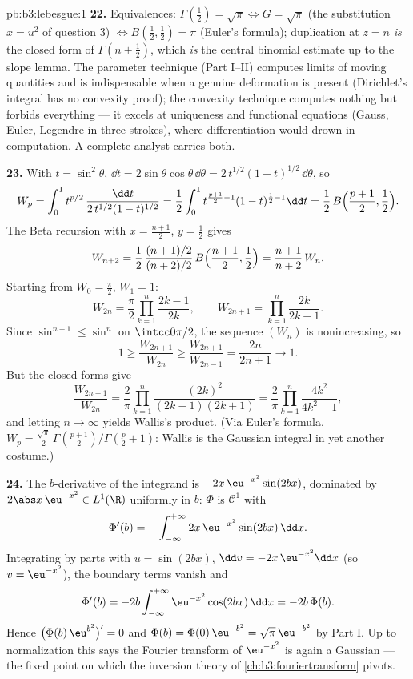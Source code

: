 \begin{solution}{pb:b3:lebesgue:1}
\textbf{22.} Equivalences: $\Gamma(\frac12) = \sqrt\pi
\Leftrightarrow G = \sqrt\pi$ (the substitution $x = u^2$ of
question 3) $\Leftrightarrow B(\frac12, \frac12) = \pi$
(Euler's formula); duplication at $z = n$ \emph{is} the
closed form of $\Gamma(n + \frac12)$, which \emph{is} the
central binomial estimate up to the slope lemma. The
parameter technique (Part I--II) computes limits of moving
quantities and is indispensable when a genuine deformation is
present (Dirichlet's integral has no convexity proof); the
convexity technique computes nothing but forbids everything
--- it excels at uniqueness and functional equations
(Gauss, Euler, Legendre in three strokes), where
differentiation would drown in computation. A complete
analyst carries both.

\textbf{23.} With $t = \sin^2\theta$, $\dd t =
2\sin\theta\cos\theta\,\dd\theta =
2\,t^{1/2}(1-t)^{1/2}\,\dd\theta$, so
\[
W_p = \int_0^1 t^{p/2}\,
\frac{\dd t}{2\,t^{1/2}(1-t)^{1/2}}
= \frac12\int_0^1 t^{\frac{p+1}2 - 1}(1-t)^{\frac12 - 1}\dd t
= \frac12\,B\Bigl(\frac{p+1}2, \frac12\Bigr).
\]
The Beta recursion with $x = \frac{n+1}2$, $y = \frac12$
gives
\[
W_{n+2} = \frac12\,
\frac{(n+1)/2}{(n+2)/2}\,B\Bigl(\frac{n+1}2, \frac12\Bigr)
= \frac{n+1}{n+2}\,W_n .
\]
Starting from $W_0 = \frac\pi2$, $W_1 = 1$:
\[
W_{2n} = \frac\pi2\prod_{k=1}^n\frac{2k-1}{2k},
\qquad
W_{2n+1} = \prod_{k=1}^n\frac{2k}{2k+1} .
\]
Since $\sin^{n+1} \leq \sin^n$ on $\intcc0{\pi/2}$, the
sequence $(W_n)$ is nonincreasing, so
\[
1 \geq \frac{W_{2n+1}}{W_{2n}} \geq
\frac{W_{2n+1}}{W_{2n-1}} = \frac{2n}{2n+1}
\longrightarrow 1 .
\]
But the closed forms give
\[
\frac{W_{2n+1}}{W_{2n}} = \frac2\pi
\prod_{k=1}^n\frac{(2k)^2}{(2k-1)(2k+1)}
= \frac2\pi\prod_{k=1}^n\frac{4k^2}{4k^2-1},
\]
and letting $n \to \infty$ yields Wallis's product. (Via
Euler's formula, $W_p = \frac{\sqrt\pi}2\,
\Gamma(\frac{p+1}2)/\Gamma(\frac p2 + 1)$: Wallis is the
Gaussian integral in yet another costume.)

\textbf{24.} The $b$-derivative of the integrand is
$-2x\,\eu^{-x^2}\sin(2bx)$, dominated by $2\abs
x\,\eu^{-x^2} \in L^1(\R)$ uniformly in $b$: $\Phi$ is
$\mathcal C^1$ with
\[
\Phi'(b) = -\int_{-\infty}^{+\infty}
2x\,\eu^{-x^2}\sin(2bx)\,\dd x .
\]
Integrating by parts with $u = \sin(2bx)$, $\dd v =
-2x\,\eu^{-x^2}\dd x$ (so $v = \eu^{-x^2}$), the boundary
terms vanish and
\[
\Phi'(b) = -2b\int_{-\infty}^{+\infty}
\eu^{-x^2}\cos(2bx)\,\dd x = -2b\,\Phi(b).
\]
Hence $\bigl(\Phi(b)\,\eu^{b^2}\bigr)' = 0$ and $\Phi(b) =
\Phi(0)\,\eu^{-b^2} = \sqrt\pi\,\eu^{-b^2}$ by Part I. Up to
normalization this says the Fourier transform of
$\eu^{-x^2}$ is again a Gaussian --- the fixed point on which
the inversion theory of \cref{ch:b3:fouriertransform} pivots.


\end{solution}
